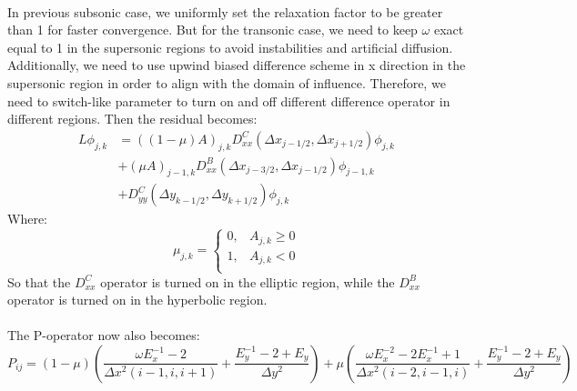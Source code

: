 \documentclass[12pt]{article}
\theoremstyle{definition}
\begin{document}
\\
In previous subsonic case, we uniformly set the relaxation factor to be greater than 1 for faster convergence. But for the transonic case, we need to keep $\omega$ exact equal to 1 in the supersonic regions to avoid instabilities and artificial diffusion. Additionally, we need to use upwind biased difference scheme in x direction in the supersonic region in order to align with the domain of influence. Therefore, we need to switch-like parameter to turn on and off different difference operator in different regions. Then the residual becomes:
\begin{equation}
\begin{aligned}
    L \phi_{j,k} &= ((1-\mu) A)_{j,k} D^C_{xx}(\Delta x_{j-1/2},\Delta x_{j+1/2}) \phi_{j,k} \\ 
    &+ (\mu A)_{j-1,k}D^B_{xx}(\Delta x_{j-3/2},\Delta x_{j-1/2}) \phi_{j-1,k} \\
    &+ D^C_{yy}(\Delta y_{k-1/2},\Delta y_{k+1/2}) \phi_{j,k}
\end{aligned}
\end{equation}
Where:
\begin{equation}
    \mu_{j,k} = \begin{cases}
        0, & \text{$A_{j,k}\geq 0$} \\
        1, & \text{$A_{j,k}< 0$} \\
    \end{cases}
\end{equation}
So that the $D^C_{xx}$ operator is turned on in the elliptic region, while the $D^B_{xx}$ operator is turned on in the hyperbolic region.\\
\\
The P-operator now also becomes:
\begin{equation}
    P_{ij} = (1-\mu) \left( \frac{\omega E_x^{-1}-2}{\Delta x^2(i-1,i,i+1)} + \frac{E_y^{-1}-2+E_y}{\Delta y^2} \right) + \mu \left( \frac{\omega E_x^{-2}-2E_x^{-1}+1}{\Delta x^2(i-2,i-1,i)} + \frac{E_y^{-1}-2+E_y}{\Delta y^2} \right)
\end{equation}
\vspace{1cm}
\end{document}
